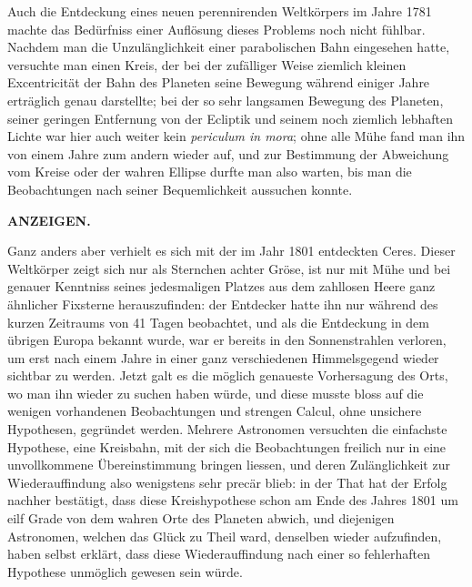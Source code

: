 Auch die Entdeckung eines neuen perennirenden Weltkörpers im Jahre 1781 machte das Bedürfniss einer Auflösung dieses Problems noch nicht fühlbar. Nachdem man die Unzulänglichkeit einer parabolischen Bahn eingesehen hatte, versuchte man einen Kreis, der bei der zufälliger Weise ziemlich kleinen Excentricität der Bahn des Planeten seine Bewegung während einiger Jahre erträglich genau darstellte; bei der so sehr langsamen Bewegung des Planeten, seiner geringen Entfernung von der Ecliptik und seinem noch ziemlich lebhaften Lichte war hier auch weiter kein \textit{periculum in mora}; ohne alle Mühe fand man ihn von einem Jahre zum andern wieder auf, und zur Bestimmung der Abweichung vom Kreise oder der wahren Ellipse durfte man also warten, bis man die Beobachtungen nach seiner Bequemlichkeit aussuchen konnte.

\clearpage
\thispagestyle{empty}
\noindent{}%
%
\parbox[t]{\dimexpr\linewidth-24mm\relax}{\centering\footnotesize\bfseries ANZEIGEN.\par}%
\makebox[12mm][r]{}\par\nobreak\medskip
Ganz anders aber verhielt es sich mit der im Jahr 1801 entdeckten Ceres. Dieser Weltkörper zeigt sich nur als Sternchen achter Gröse, ist nur mit Mühe und bei genauer Kenntniss seines jedesmaligen Platzes aus dem zahllosen Heere ganz ähnlicher Fixsterne herauszufinden: der Entdecker hatte ihn nur während des kurzen Zeitraums von 41 Tagen beobachtet, und als die Entdeckung in dem übrigen Europa bekannt wurde, war er bereits in den Sonnenstrahlen verloren, um erst nach einem Jahre in einer ganz verschiedenen Himmelsgegend wieder sichtbar zu werden. Jetzt galt es die möglich genaueste Vorhersagung des Orts, wo man ihn wieder zu suchen haben würde, und diese musste bloss auf die wenigen vorhandenen Beobachtungen und strengen Calcul, ohne unsichere Hypothesen, gegründet werden. Mehrere Astronomen versuchten die einfachste Hypothese, eine Kreisbahn, mit der sich die Beobachtungen freilich nur in eine unvollkommene Übereinstimmung bringen liessen, und deren Zulänglichkeit zur Wiederauffindung also wenigstens sehr precär blieb: in der That hat der Erfolg nachher bestätigt, dass diese Kreishypothese schon am Ende des Jahres 1801 um eilf Grade von dem wahren Orte des Planeten abwich, und diejenigen Astronomen, welchen das Glück zu Theil ward, denselben wieder aufzufinden, haben selbst erklärt, dass diese Wiederauffindung nach einer so fehlerhaften Hypothese unmöglich gewesen sein würde.

